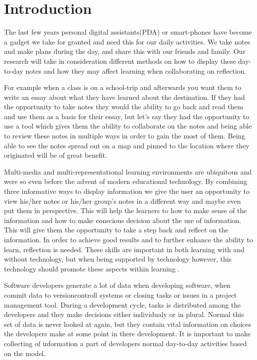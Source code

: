 \chapter{Introduction}
The last few years personal digital assistants(PDA) or smart-phones have become a gadget we take for granted and need this for our daily activities.  We take notes and make plans during the day, and share this with our friends and family. Our research will take in consideration different methods on how to display these day-to-day notes and how they may affect learning when collaborating on reflection.

For example when a class is on a school-trip and afterwards you want them to write an essay about what they have learned about the destination. If they had the opportunity to take notes they would the ability to go back and read them and use them as a basis for their essay, but let’s say they had the opportunity to use a tool which gives them the ability to collaborate on the notes and being able to review these notes in multiple ways in order to gain the most of them. Being able to see the notes spread out on a map and pinned to the location where they originated will be of great benefit.

Multi-media and multi-representational learning environments are ubiquitous and were so even before the advent of modern educational technology.\cite{Ainsworth1999} By combining three informative ways to display information we give the user an opportunity to view his/her notes or his/her group’s notes in a different way and maybe even put them in perspective. This will help the learners to how to make sense of the information and how to make conscious decision about the use of information. This will give them the opportunity to take a step back and reflect on the information. In order to achieve good results and to further enhance the ability to learn, reflection is needed. These skills are important in both learning with and without technology, but when being supported by technology however, this technology should promote these aspects within learning \cite{Lin1999}.

Software developers generate a lot of data when developing software, when commit data to versioncontroll systems or closing tasks or issues in a project management tool. During a development cycle, tasks is distributed among the developers and they make decisions either individualy or in plural. Normal this set of data is never looked at again, but they contain vital information on choices the developers make at some point in there development. It is important to make collecting of information a part of developers normal day-to-day activities based on the model\cite{Krogstie2009}.

